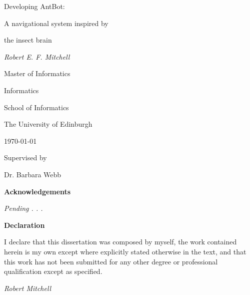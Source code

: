 \documentclass[a4paper,11pt,twoside,openright]{article}
\begin{document}
\centering
\vspace*{6cm}
        {\huge Developing AntBot: \par A navigational system inspired by \par the
          insect brain \par}
\vspace{1cm}
{\Large \textit{Robert E. F. Mitchell}}

\vspace{3cm}

{\large Master of Informatics \par}
{\large Informatics \par}
{\large School of Informatics \par}
{\large The University of Edinburgh \par}
\large \today \par

\vfill
Supervised by\par
Dr. Barbara Webb

\newpage
\thispagestyle{empty}
\mbox{}
\newpage

\centering
{\LARGE \textbf{Acknowledgements}}
\begin{flushleft}
 {\small \textit{Pending . . .} }
\end{flushleft}

\newpage
\thispagestyle{empty}
\mbox{}
\newpage

\centering
{\LARGE\textbf{Declaration}}
\begin{flushleft}
  {\small
    I declare that this dissertation was composed by myself, the work
    contained herein is my own except where explicitly stated otherwise
    in the text, and that this work has not been submitted for any other
    degree or professional qualification except as specified.
    \par

    \textit{Robert Mitchell}}

\end{flushleft}
\end{document}
